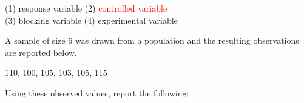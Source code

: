 \documentclass[addpoints]{examsetup}
\begin{document}
\begin{questions}
(1) response variable\hspace{1cm} (2) \textcolor{red}{controlled variable}\\
(3) blocking variable\hspace{1cm} (4) experimental variable
\vspace{1cm}
\pagebreak

\question

A sample of size 6 was drawn from a population and the resulting observations are reported below. 
\begin{center}
110, 100, 105, 103, 105, 115
\end{center}
Using these observed values, report the following:
\vspace{1cm}

\end{questions}
\end{document}
